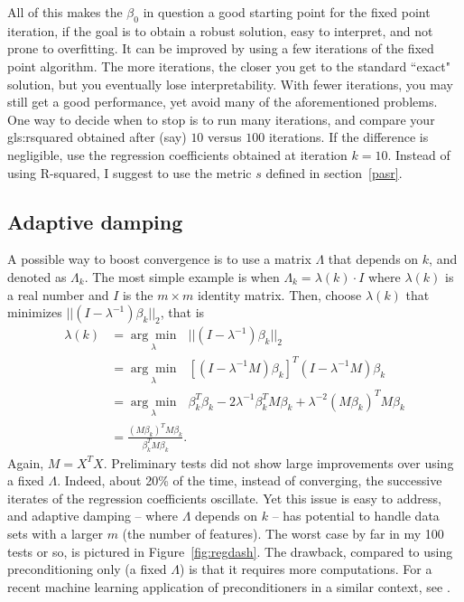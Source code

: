 \documentclass[oneside,10pt]{book}
\begin{document}
All of this makes the $\beta_0$ in question a good starting point for the fixed point iteration, if the goal is to obtain a robust solution, easy to interpret, and not prone to overfitting. It can be improved by using a few iterations of the fixed point algorithm. The more iterations, the closer you get to the standard ``exact" solution, but you eventually lose interpretability. With fewer iterations, you may still get a good performance, yet avoid many of the aforementioned problems. One way to decide when to stop is to run many iterations, and compare your \gls{gls:rsquared} obtained after (say) $10$ versus $100$ iterations. If the difference is negligible, use the regression coefficients obtained at iteration $k=10$. Instead of using R-squared, I suggest to use the metric $s$  defined in section~\ref{pasr}.




\subsection{Adaptive damping}

A possible way to boost convergence is to use a matrix $\Lambda$ that depends on $k$, and denoted as $\Lambda_k$. The most simple example is when
$\Lambda_k=\lambda(k)\cdot I$ where $\lambda(k)$ is a real number and $I$ is the $m\times m$ identity matrix.
Then, choose $\lambda(k)$ that minimizes $||(I-\lambda^{-1})\beta_k ||_2$, that is
\begin{align}
\lambda(k) & =\underset{\lambda}{\arg\min} \text{ } ||(I-\lambda^{-1})\beta_k ||_2 \nonumber\\
 &= \underset{\lambda}{\arg\min} \text{ } [(I-\lambda^{-1}M)\beta_k]^T (I-\lambda^{-1}M)\beta_k \nonumber\\
&= \underset{\lambda}{\arg\min} \text{ }  \beta_k^T\beta_k -2\lambda^{-1}\beta_k^T M \beta_k+ \lambda^{-2}(M\beta_k)^T M\beta_k \nonumber \\
& =  \frac{(M\beta_k )^T M \beta_k}{\beta_k^T M \beta_k} .\nonumber
\end{align}
Again, $M=X^TX$. Preliminary tests did not show large improvements over using a fixed $\Lambda$. Indeed, about 20\% of the time, instead of converging, the successive iterates of the regression coefficients oscillate. Yet this issue is easy to address, and adaptive damping -- where $\Lambda$ depends on $k$ -- has potential to handle data sets with a larger $m$ (the number of features). The worst case by far in my 100 tests or so, is pictured in Figure~\ref{fig:regdash}. The drawback, compared to using preconditioning only (a fixed $\Lambda$) is that it requires more computations. For a recent machine learning application of preconditioners in a similar context, see
\cite{oxford2020}.
\end{document}
